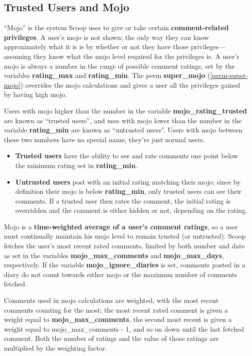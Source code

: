 \subsection{Trusted Users and Mojo}
\label{features-mojo}

``Mojo'' is the system Scoop uses to give or take certain {\bf comment-related privileges}.  A user's mojo is not shown; the only way they can know approximately what it is is by whether or not they have those privileges---assuming they know what the mojo level required for the privileges is.  A user's mojo is always a number in the range of possible comment ratings, set by the variables {\bf rating\_max} and {\bf rating\_min}.  The perm {\bf super\_mojo} (\ref{perm-super-mojo}) overrides the mojo calculations and gives a user all the privileges gained by having high mojo.

Users with mojo higher than the number in the variable {\bf mojo\_rating\_trusted} are known as ``trusted users'', and uses with mojo lower than the number in the variable {\bf rating\_min} are known as ``untrusted users''.  Users with mojo between these two numbers have no special name, they're just normal users.  

\begin{itemize}
\item {\bf Trusted users} have the ability to see and rate comments one point below the minimum rating set in {\bf rating\_min}.  
\item {\bf Untrusted users} post with an initial rating matching their mojo; since by definition their mojo is below {\bf rating\_min}, only trusted users can see their comments.  If a trusted user then rates the comment, the initial rating is overridden and the comment is either hidden or not, depending on the rating.
\end{itemize}

Mojo is a {\bf time-weighted average of a user's comment ratings}, so a user must continually maintain his mojo level to remain trusted (or untrusted).  Scoop fetches the user's most recent rated comments, limited by both number and date as set in the variables {\bf mojo\_max\_comments} and {\bf mojo\_max\_days}, respectively.  If the variable {\bf mojo\_ignore\_diaries} is set, comments posted in a diary do not count towards either mojo or the maximum number of comments fetched.

Comments used in mojo calculations are weighted, with the most recent comments counting for the most; the most recent rated comment is given a weight equal to {\bf mojo\_max\_comments}, the second most recent is given a weight equal to mojo\_max\_comments - 1, and so on down until the last fetched comment.  Both the number of ratings and the value of those ratings are multiplied by the weighting factor.  

